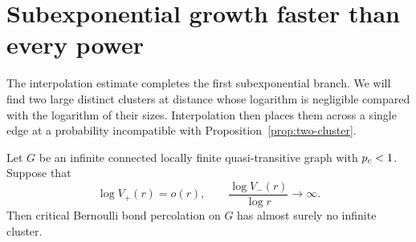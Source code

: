 \section{Subexponential growth faster than every power}
\label{sec:superpolynomial}

The interpolation estimate completes the first subexponential branch.
We will find two large distinct clusters at distance whose logarithm
is negligible compared with the logarithm of their sizes. Interpolation
then places them across a single edge at a probability incompatible
with Proposition~\ref{prop:two-cluster}.

\begin{theorem}\label{thm:superpoly}
Let $G$ be an infinite connected locally finite quasi-transitive graph
with $p_c<1$. Suppose that
\[
 \log V_+(r)=o(r),
 \qquad \frac{\log V_-(r)}{\log r}\longrightarrow\infty.
\]
Then critical Bernoulli bond percolation on $G$ has almost surely no
infinite cluster.
\end{theorem}

